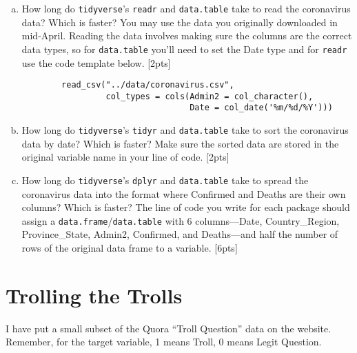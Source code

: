 \documentclass[12pt]{article}
\begin{document}
\begin{enumerate}[(a)]
	\item How long do \verb|tidyverse|'s \verb|readr| and \verb|data.table| take to read the coronavirus data? Which is faster? You may use the data you originally downloaded in mid-April. Reading the data involves making sure the columns are the correct data types, so for \verb|data.table| you'll need to set the Date type and for \verb|readr| use the code template below. [2pts]
	\begin{verbatim}
		read_csv("../data/coronavirus.csv",
		         col_types = cols(Admin2 = col_character(),
		                          Date = col_date('%m/%d/%Y')))
	\end{verbatim}
	\item How long do \verb|tidyverse|'s \verb|tidyr| and \verb|data.table| take to sort the coronavirus data by date? Which is faster? Make sure the sorted data are stored in the original variable name in your line of code. [2pts]
	\item How long do \verb|tidyverse|'s \verb|dplyr| and \verb|data.table| take to spread the coronavirus data into the format where Confirmed and Deaths are their own columns? Which is faster? The line of code you write for each package should assign a \verb|data.frame|/\verb|data.table| with 6 columns---Date, Country\_Region, Province\_State, Admin2, Confirmed, and Deaths---and half the number of rows of the original data frame to a variable. [6pts]
\end{enumerate}

\section{Trolling the Trolls}

I have put a small subset of the Quora ``Troll Question'' data on the website. Remember, for the target variable, 1 means Troll, 0 means Legit Question.
\end{document}
